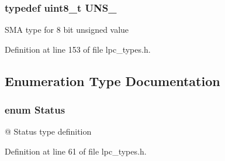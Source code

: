 \hypertarget{group___l_p_c___types___public___types_ga7353117656180c64d2216c874998b98b}{
\subsubsection[{\-U\-N\-S\-\_\-8}]{\setlength{\rightskip}{0pt plus 5cm}typedef uint8\-\_\-t {\bf \-U\-N\-S\-\_}}}\label{group___l_p_c___types___public___types_ga7353117656180c64d2216c874998b98b}
\-S\-M\-A type for 8 bit unsigned value 

\-Definition at line 153 of file lpc\-\_\-types.\-h.



\subsection{\-Enumeration \-Type \-Documentation}
\hypertarget{group___l_p_c___types___public___types_ga67a0db04d321a74b7e7fcfd3f1a3f70b}{
\subsubsection[{\-Status}]{\setlength{\rightskip}{0pt plus 5cm}enum {\bf \-Status}}}\label{group___l_p_c___types___public___types_ga67a0db04d321a74b7e7fcfd3f1a3f70b}
@ \-Status type definition 

\-Definition at line 61 of file lpc\-\_\-types.\-h.

